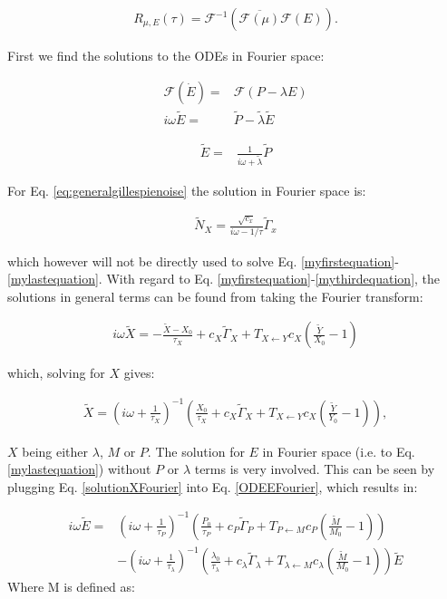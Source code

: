 \begin{align}
R_{\mu,E}(\tau) = \mathcal{F}^{-1} \left( \overline{\mathcal{F} (\mu)} \mathcal{F}(E) \right)
.
\end{align}

First we find the solutions to the ODEs in Fourier space:

\begin{align}
\label{ODEEFourier}
\mathcal{F} \left( \dot{E} \right) = & \mathcal{F} \left( P - \lambda E \right) \nonumber \\
%
i\omega \tilde{E} = & \tilde{P} - \tilde{\lambda} \tilde{E}
\end{align}

\begin{align}
 \tilde{E} = & \frac{1}{i\omega+\tilde{\lambda}} \tilde{P} 
\end{align}

For Eq. \ref{eq:generalgillespienoise} the solution in Fourier space is:

\begin{align}
\tilde{N}_X = \frac{\sqrt{c_x}}{i\omega - 1/\tau} \tilde{\Gamma}_x
\end{align}

which however will not be directly used to solve Eq. \ref{myfirstequation}-\ref{mylastequation}. With regard to  Eq. \ref{myfirstequation}-\ref{mythirdequation}, the solutions in general terms can be found from taking the Fourier transform:

\begin{align}
i \omega \tilde{X} = - \frac{\tilde{X}-X_0}{\tau_X} + c_X \tilde{\Gamma}_X + T_{X \leftarrow Y} c_X (\frac{\tilde{Y}}{X_0} - 1)
\end{align}

which, solving for $X$ gives:

\begin{align}
\label{solutionXFourier}
\tilde{X} = \left( i \omega + \frac{1}{\tau_X} \right)^{-1} \left( \frac{X_0}{\tau_X} + c_X \tilde{\Gamma}_X + T_{X \leftarrow Y} c_X (\frac{\tilde{Y}}{Y_0} - 1) \right)
,
\end{align}

$X$ being either $\lambda$, $M$ or $P$.
%
The solution for $E$ in Fourier space (i.e. to Eq. \ref{mylastequation}) without $P$ or $\lambda$ terms is very involved. This can be seen by plugging Eq. \ref{solutionXFourier} into Eq. \ref{ODEEFourier}, which results in:

\begin{align}
\label{ODEEFourierExpanded}
i\omega \tilde{E} = & 
\left( i \omega + \frac{1}{\tau_P} \right)^{-1} \left( \frac{P_0}{\tau_P} + c_P \tilde{\Gamma}_P + T_{P \leftarrow M} c_P (\frac{\tilde{M}}{M_0} - 1) \right)
     \nonumber \\
    & -
    \left( i \omega + \frac{1}{\tau_\lambda} \right)^{-1} \left( \frac{\lambda_0}{\tau_\lambda} + c_\lambda \tilde{\Gamma}_\lambda + T_{\lambda \leftarrow M} c_\lambda (\frac{\tilde{M}}{M_0} - 1) \right)
     \tilde{E}
\end{align}
Where M is defined as:

